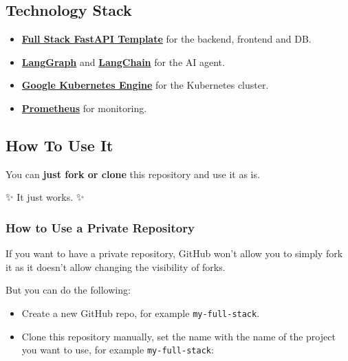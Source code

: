 \hypertarget{technology-stack}{%
\subsection{Technology Stack}\label{technology-stack}}

\begin{itemize}
\tightlist
\item
  \href{https://github.com/tiangolo/full-stack-fastapi-template}{\textbf{Full
  Stack FastAPI Template}} for the backend, frontend and DB.
\item
  \href{https://langchain-ai.github.io/langgraph/}{\textbf{LangGraph}}
  and \href{https://www.langchain.com/}{\textbf{LangChain}} for the AI
  agent.
\item
  \href{https://cloud.google.com/kubernetes-engine}{\textbf{Google
  Kubernetes Engine}} for the Kubernetes cluster.
\item
  \href{https://prometheus.io/}{\textbf{Prometheus}} for monitoring.
\end{itemize}

\hypertarget{how-to-use-it}{%
\subsection{How To Use It}\label{how-to-use-it}}

You can \textbf{just fork or clone} this repository and use it as is.

✨ It just works. ✨

\hypertarget{how-to-use-a-private-repository}{%
\subsubsection{How to Use a Private
Repository}\label{how-to-use-a-private-repository}}

If you want to have a private repository, GitHub won't allow you to
simply fork it as it doesn't allow changing the visibility of forks.

But you can do the following:

\begin{itemize}
\tightlist
\item
  Create a new GitHub repo, for example \texttt{my-full-stack}.
\item
  Clone this repository manually, set the name with the name of the
  project you want to use, for example \texttt{my-full-stack}:
\end{itemize}

\begin{Shaded}
\begin{Highlighting}[]
\end{Highlighting}
\end{Shaded}

